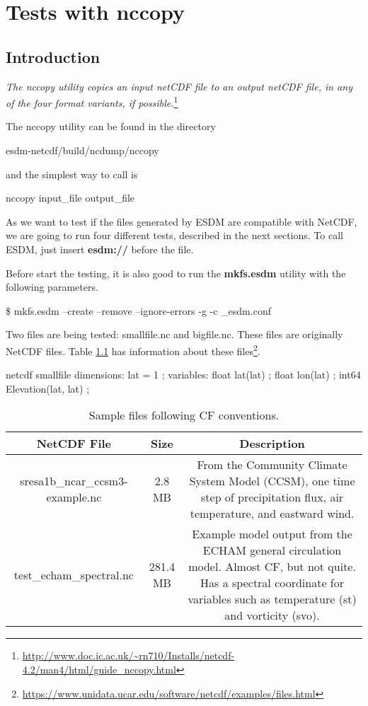 \chapter{Tests with nccopy}
\label{ch:nccopy}

\section{Introduction}

\tab
\textit{The nccopy utility copies an input netCDF file to an output netCDF file, in any of the four format variants, if possible.}\footnote{\url{http://www.doc.ic.ac.uk/~rn710/Installs/netcdf-4.2/man4/html/guide_nccopy.html}}

The nccopy utility can be found in the directory

\begin{framed}
esdm-netcdf/build/ncdump/nccopy
\end{framed}

and the simplest way to call is

\begin{framed}
nccopy input\_file output\_file
\end{framed}

As we want to test if the files generated by ESDM are compatible with NetCDF, we are going to run four different tests, described in the next sections. To call ESDM, just insert \textbf{esdm://} before the file.

Before start the testing, it is also good to run the \textbf{mkfs.esdm} utility with the following parameters.

\begin{framed}
\$ mkfs.esdm --create --remove --ignore-errors -g -c \_esdm.conf
\end{framed}

Two files are being tested: smallfile.nc and bigfile.nc. These files are originally NetCDF files. Table \ref{tab:netcdf} has information about these files\footnote{\url{https://www.unidata.ucar.edu/software/netcdf/examples/files.html}}.

netcdf smallfile {
dimensions:
	lat = 1 ;
variables:
	float lat(lat) ;
	float lon(lat) ;
	int64 Elevation(lat, lat) ;
}

\begin{table}[H]
\centering
\begin{tabular}{|c|c|c|}
\hline
\multicolumn{1}{|c|}{NetCDF File}	& \multicolumn{1}{|c|}{Size} & \multicolumn{1}{|c|}{Description} \\ \hline \hline
sresa1b\_ncar\_ccsm3-example.nc & 2.8 MB & From the Community Climate System Model (CCSM), one time step of precipitation flux, air temperature, and eastward wind. \\ \hline
test\_echam\_spectral.nc & 281.4 MB & Example model output from the ECHAM general circulation model. Almost CF, but not quite. Has a spectral coordinate for variables such as temperature (st) and vorticity (svo). \\ \hline
\hline
\end{tabular}
\caption{\label{tab:netcdf} Sample files following CF conventions.}
\end{table}

